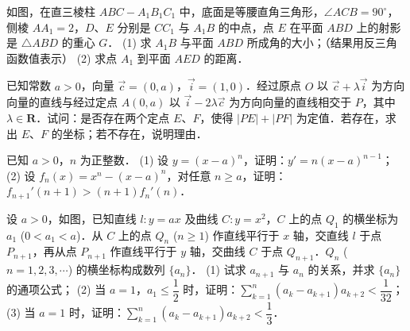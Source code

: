 \begin{question}
如图，在直三棱柱 $ABC - A_1B_1C_1$ 中，底面是等腰直角三角形，$\angle ACB = 90^\circ$，侧棱 $AA_1 = 2$，$D$、$E$ 分别是 $CC_1$ 与 $A_1B$ 的中点，点 $E$ 在平面 $ABD$ 上的射影是 $\triangle ABD$ 的重心 $G$．
(1) 求 $A_1B$ 与平面 $ABD$ 所成角的大小；（结果用反三角函数值表示）
(2) 求点 $A_1$ 到平面 $AED$ 的距离．
\nopagebreak[4]
\begin{center}\end{center}
\nopagebreak[4]
\end{question}
\begin{question}
已知常数 $a > 0$，向量 $\vec{c} = (0, a)$，$\vec{i} = (1, 0)$．经过原点 $O$ 以 $\vec{c} + \lambda\vec{i}$ 为方向向量的直线与经过定点 $A(0, a)$ 以 $\vec{i} - 2\lambda\vec{c}$ 为方向向量的直线相交于 $P$，其中 $\lambda \in \mathbf{R}$．试问：是否存在两个定点 $E$、$F$，使得 $|PE| + |PF|$ 为定值．若存在，求出 $E$、$F$ 的坐标；若不存在，说明理由．

\end{question}
\begin{question}
已知 $a > 0$，$n$ 为正整数．
(1) 设 $y = (x - a)^n$，证明：$y' = n(x - a)^{n-1}$；
(2) 设 $f_n(x) = x^n - (x - a)^n$，对任意 $n \ge a$，证明：$f_{n+1}'(n+1) > (n+1)f_n'(n)$．

\Needspace{0.4\textheight}
\end{question}
\begin{question}
设 $a > 0$，如图，已知直线 $l: y = ax$ 及曲线 $C: y = x^2$，$C$ 上的点 $Q_1$ 的横坐标为 $a_1$ ($0 < a_1 < a$)．从 $C$ 上的点 $Q_n$ ($n \ge 1$) 作直线平行于 $x$ 轴，交直线 $l$ 于点 $P_{n+1}$，再从点 $P_{n+1}$ 作直线平行于 $y$ 轴，交曲线 $C$ 于点 $Q_{n+1}$．$Q_n$ ($n = 1, 2, 3, \cdots$) 的横坐标构成数列 $\{a_n\}$．
(1) 试求 $a_{n+1}$ 与 $a_n$ 的关系，并求 $\{a_n\}$ 的通项公式；
(2) 当 $a = 1$，$a_1 \le \dfrac{1}{2}$ 时，证明：$\sum_{k=1}^n (a_k - a_{k+1}) a_{k+2} < \dfrac{1}{32}$；
(3) 当 $a = 1$ 时，证明：$\sum_{k=1}^n (a_k - a_{k+1}) a_{k+2} < \dfrac{1}{3}$．
\nopagebreak[4]
\begin{center}\end{center}
\nopagebreak[4]

\end{question}